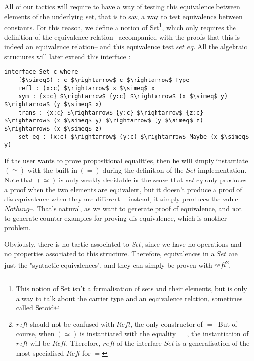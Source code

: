 All of our tactics will require to have a way of testing this equivalence between elements of the underlying set, that is to say, a way to test equivalence between constants. For this reason, we define a notion of Set\footnote{This notion of Set isn't a formalisation of sets and their elements, but is only a way to talk about the carrier type and an equivalence relation, sometimes called Setoid}, which only requires the definition of the equivalence relation --accompanied with the proofs that this is indeed an equivalence relation-- and this equivalence test $set\_eq$. All the algebraic structures will later extend this interface :

\begin{lstlisting}
interface Set c where
    ($\simeq$) : c $\rightarrow$ c $\rightarrow$ Type
    refl : (x:c) $\rightarrow$ x $\simeq$ x
    sym : {x:c} $\rightarrow$ {y:c} $\rightarrow$ (x $\simeq$ y) $\rightarrow$ (y $\simeq$ x)
    trans : {x:c} $\rightarrow$ {y:c} $\rightarrow$ {z:c} $\rightarrow$ (x $\simeq$ y) $\rightarrow$ (y $\simeq$ z) $\rightarrow$ (x $\simeq$ z)    
    set_eq : (x:c) $\rightarrow$ (y:c) $\rightarrow$ Maybe (x $\simeq$ y)
\end{lstlisting}

If the user wants to prove propositional equalities, then he will simply instantiate $(\simeq)$ with the built-in $(=)$ during the definition of the $Set$ implementation.
Note that $(\simeq)$ is only weakly decidable in the sense that $set\_eq$ only produces a proof when the two elements are equivalent, but it doesn't produce a proof of dis-equivalence when they are different -- instead, it simply produces the value $Nothing$--. That's natural, as we want to generate proof of equivalence, and not to generate counter examples for proving dis-equivalence, which is another problem.

Obviously, there is no tactic associated to $Set$, since we have no operations and no properties associated to this structure. Therefore, equivalences in a $Set$ are just the "syntactic equivalences", and they can simply be proven with $refl$\footnote{$refl$ should not be confused with $Refl$, the only constructor of $=$. But of course, when $(\simeq)$ is instantiated with the equality $=$, the instantiation of $refl$ will be $Refl$. Therefore, $refl$ of the interface $Set$ is a generalisation of the most specialised $Refl$ for $=$}.


